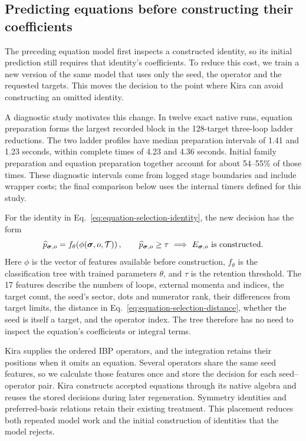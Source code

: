 \clearpage
\subsection{Predicting equations before constructing their coefficients}
\label{sec:early-equation-selection}
The preceding equation model first inspects a constructed identity, so its
initial prediction still requires that identity's coefficients. To reduce
this cost, we train a new version of the same model that uses only the seed,
the operator and the requested targets. This moves the decision to the point
where Kira can avoid constructing an omitted identity.

A diagnostic study motivates this change. In twelve exact native runs,
equation preparation forms the largest recorded block in the 128-target
three-loop ladder reductions. The two ladder profiles have median
preparation intervals of 1.41 and 1.23 seconds, within complete times of
4.23 and 4.36 seconds. Initial family preparation and equation preparation
together account for about 54--55\% of those times. These diagnostic
intervals come from logged stage boundaries and include wrapper costs;
the final comparison below uses the internal timers defined for this study.

For the identity in Eq.~\eqref{eq:equation-selection-identity}, the new
decision has the form
\begin{equation}
 \widehat p_{\boldsymbol\sigma,o}
 =f_\theta\!\left(\phi(\boldsymbol\sigma,o,\mathcal T)\right),
 \qquad
 \widehat p_{\boldsymbol\sigma,o}\geq\tau
 \ \Longrightarrow\ E_{\boldsymbol\sigma,o}\ \hbox{is constructed}.
 \label{eq:early-equation-decision}
\end{equation}
Here $\phi$ is the vector of features available before construction,
$f_\theta$ is the classification tree with trained parameters $\theta$,
and $\tau$ is the retention threshold. The 17 features describe the
numbers of loops, external momenta and indices, the target count, the
seed's sector, dots and numerator rank, their differences from target
limits, the distance in Eq.~\eqref{eq:equation-selection-distance},
whether the seed is itself a target, and the operator index.
The tree therefore has no need to inspect the equation's coefficients
or integral terms.

Kira supplies the ordered IBP operators, and the integration retains their
positions when it omits an equation. Several operators share the same seed
features, so we calculate those features once and store the decision for
each seed--operator pair. Kira constructs accepted equations through its
native algebra and reuses the stored decisions during later regeneration.
Symmetry identities and preferred-basis relations retain their existing
treatment. This placement reduces both repeated model work and the initial
construction of identities that the model rejects.

